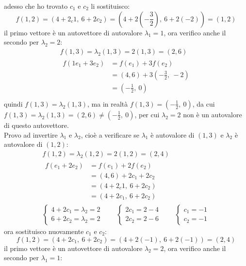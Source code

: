 \documentclass[italian]{article}
\begin{document}
adesso che ho trovato $c_1$ e $c_2$ li sostituisco:
\[
	f(1,2) = (4+2_c1,\ 6+2c_2) = \left(4+2\left(-\frac{3}{2}\right),\ 6+2(-2) \right) = (1,2)
\]
il primo vettore è un autovettore di autovalore $\lambda_1=1$, ora verifico anche il secondo per $\lambda_2 = 2$:
\begin{gather*}
	f(1,3) = \lambda_2(1,3) = 2(1,3) = (2,6) \\
	\begin{split}
		f(1e_1 + 3e_2) &= f(e_1) + 3f(e_2) \\
		&= (4,6) + 3\left(-\frac{3}{2},\ -2 \right) \\
		&= \left(-\frac{1}{2},\ 0\right) \\
	\end{split}
\end{gather*}
quindi $f(1,3) = \lambda_2(1,3)$, ma in realtà $f(1,3) = \left(-\frac{1}{2},\ 0\right)$, da cui $f(1,3) = \lambda_2(1,3) = (2,6) \neq \left(-\frac{1}{2},\ 0\right)$, per cui $\lambda_2=2$ non è un autovalore di questo autovettore. \\
Provo ad invertire $\lambda_1$ e $\lambda_2$, cioè a verificare se $\lambda_1$ è autovalore di $(1,3)$ e $\lambda_2$ è autovalore di $(1,2)$:
\begin{gather*}
	f(1,2) = \lambda_2(1,2) = 2(1,2) = (2,4)\\
	\begin{split}
		f(e_1 + 2e_2) &= f(e_1) + 2f(e_2) \\
		&= (4,6) + 2c_1+2c_2 \\
		&= (4+2_c1,\ 6+2c_2) \\
		&= (4+2c_1,\ 6+2c_2)
	\end{split}\\
	\begin{cases*}
		4+2c_1 = \lambda_2 = 2 \\
		6+2c_2 = \lambda_2 = 2
	\end{cases*}
	\qquad
	\begin{cases*}
		2c_1 = 2 - 4 \\
		2c_2 = 2 - 6
	\end{cases*}
	\qquad
	\begin{cases*}
		c_1 = -1 \\
		c_2 = -1
	\end{cases*}
\end{gather*}
ora sostituisco nuovamente $c_1$ e $c_2$:
\[
	f(1,2) = (4+2c_1,\ 6+2c_2) = (4+2(-1),\ 6+2(-1)) = (2,4)
\]
il primo vettore è un autovettore di autovalore $\lambda_2=2$, ora verifico anche il secondo per $\lambda_1 = 1$:
\end{document}
